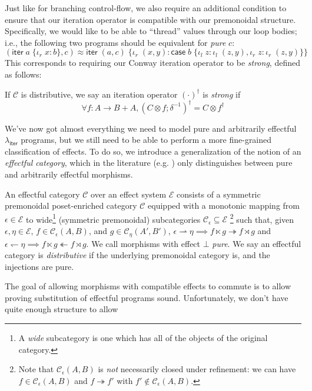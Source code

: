 \documentclass[acmsmall,screen,anonymous,review]{acmart}
\newcommand{\mc}[1]{\ensuremath{\mathcal{#1}}}
\newcommand{\ms}[1]{\ensuremath{\mathsf{#1}}}
\newcommand{\lto}{:}
\newcommand{\linl}[1]{\iota_l\;{#1}}
\newcommand{\linr}[1]{\iota_r\;{#1}}
\newcommand{\caseexpr}[5]{\ms{case}\;#1\;\{\linl{#2} \lto #3, \linr{#4} \lto #5\}}
\newcommand{\liter}[3]{\ms{iter}\;#1\;\{ \linr{#2} \lto #3 \}}
\newcommand{\cref}{\twoheadrightarrow}
\newcommand{\anticref}{\twoheadleftarrow}
\newcommand{\subiterexp}{\texorpdfstring{\(\lambda_{\ms{iter}}\)}{lambda-iter}}
\newcommand{\rightmove}{\rightharpoonup}
\newcommand{\leftmove}{\leftharpoondown}
\begin{document}
Just like for branching control-flow, we also require an additional condition to ensure that our
iteration operator is compatible with our premonoidal structure. Specifically, we would like to be
able to ``thread'' values through our loop bodies; i.e., the following two programs should be
equivalent for \emph{pure} $c$:
$$
(\liter{a}{x}{b}, c) \approx \liter{(a, c)}{(x, y)}
  {\caseexpr{b}{z}{\linl{(z, y)}}{z}{\linr{(z, y)}}}
$$
This corresponds to requiring our Conway iteration operator to be \emph{strong}, defined as follows:
\begin{definition}
  If $\mc{C}$ is distributive, we say an iteration operator $(\cdot)^\dagger$ is \emph{strong} if
  $$
  \forall f: A \to B + A, (C \otimes f ; \delta^{-1})^\dagger = C \otimes f^\dagger
  $$
\end{definition}
We've now got almost everything we need to model pure and arbitrarily effectful \subiterexp{}
programs, but we still need to be able to perform a more fine-grained classification of effects. To
do so, we introduce a generalization of the notion of an \emph{effectful category}, which in the
literature (e.g. \cite{promonad}) only distinguishes between pure and arbitrarily effectful
morphisms.
\begin{definition}
  An effectful category $\mc{C}$ over an effect system $\mc{E}$ consists of a symmetric premonoidal
  poset-enriched category $\mc{C}$ equipped with a  monotonic mapping from $\epsilon \in \mc{E}$ to
  wide\footnote{A \emph{wide} subcategory is one which has all of the objects of the original
  category.} (symmetric premonoidal) subcategories $\mc{C}_\epsilon \subseteq \mc{E}$ 
  \footnote{
    Note that $\mc{C}_\epsilon(A, B)$ is \emph{not} necessarily closed under refinement:
    we can have $f \in \mc{C}_\epsilon(A, B)$ and $f \cref f'$ with 
    $f' \notin \mc{C}_\epsilon(A, B)$.
  }
  such that,
  given $\epsilon, \eta \in \mc{E}$, $f \in \mc{C}_\epsilon(A, B)$, and $g \in \mc{C}_\eta(A', B')$,
  $\epsilon \rightmove \eta \implies f \ltimes g \cref f \rtimes g$
  and
  $\epsilon \leftmove \eta \implies f \ltimes g \anticref f \rtimes g$.
  We call morphisms with effect $\bot$ \emph{pure}. We say an effectful category is
  \emph{distributive} if the underlying premonoidal category is, and the injections are pure.
\end{definition}
The goal of allowing morphisms with compatible effects to commute is to allow proving substitution
of effectful programs sound. Unfortunately, we don't have quite enough structure to allow
\end{document}
